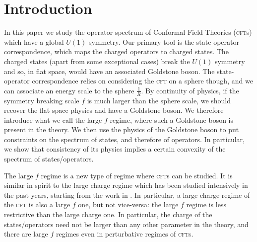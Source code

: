 \documentclass[11pt]{article}
\numberwithin{equation}{section}
\begin{document}
	\thispagestyle{empty}
	\clearpage
	
	\tableofcontents
	
	\setcounter{page}{1}
	
	

\section{Introduction}
\label{sec:intro}
	
	In this paper we study the operator spectrum of Conformal Field Theories (\textsc{cft}s) which have a global $U(1)$ symmetry. Our primary tool is the state-operator correspondence, which maps the charged operators to charged states. The charged states (apart from some exceptional cases) break the $U(1)$ symmetry and so, in flat space, would have an associated Goldstone boson. The state-operator correspondence relies on considering the \textsc{cft} on a sphere though, and we can associate an energy scale to the sphere $\frac{1}{R}$. By continuity of physics, if the symmetry breaking scale $f$ is much larger than the sphere scale, we should recover the flat space physics and have a Goldstone boson. We therefore introduce what we call the large $f$ regime, where such a Goldstone boson is present in the theory. We then use the physics of the Goldstone boson to put constraints on the spectrum of states, and therefore of operators. In particular, we show that consistency of its physics implies a certain convexity of the spectrum of states/operators. 
	
	The large $f$ regime is a new type of regime where \textsc{cft}s can be studied. It is similar in spirit to the large charge regime which has been studied intensively in the past years, starting from the work in \cite{Hellerman:2015nra}. In particular, a large charge regime of the \textsc{cft} is also a large $f$ one, but not vice-versa: the large $f$ regime is less restrictive than the large charge one. In particular, the charge of the states/operators need not be larger than any other parameter in the theory, and there are large $f$ regimes even in perturbative regimes of \textsc{cft}s.  
	
\end{document}
